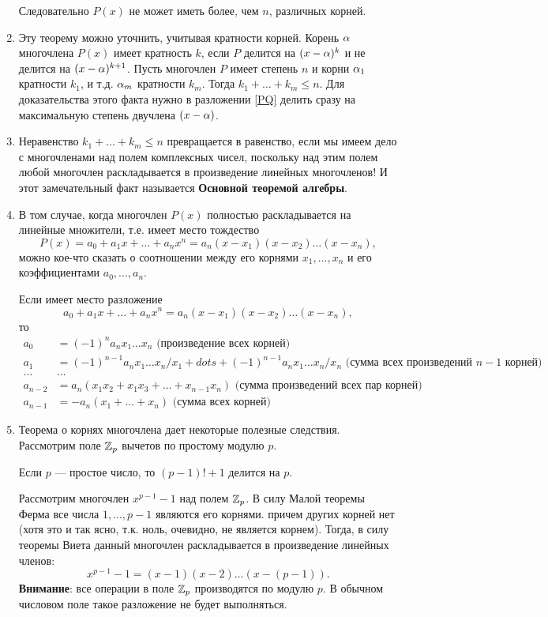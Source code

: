 \begin{enumerate}
Следовательно $P(x)$ не может иметь более, чем $n$, различных корней.
\epf

\item Эту теорему можно уточнить, учитывая кратности корней. Корень $\alpha$ многочлена $P(x)$ имеет кратность $k$, если $P$ делится на $(x-\alpha)^k$ и не делится на $(x-\alpha)^{k+1}$. Пусть многочлен $P$ имеет степень $n$ и корни $\alpha_1$ кратности $k_1$, и т.д. $\alpha_m$ кратности $k_m$. Тогда $k_1+\dots+k_m\le n$. Для доказательства этого факта нужно в разложении \eqref{PQ} делить сразу на максимальную степень двучлена $(x-\alpha)$.
\item Неравенство $k_1+\dots+k_m\le n$ превращается в равенство, если мы имеем дело с многочленами над полем комплексных чисел, поскольку над этим полем любой многочлен раскладывается в произведение линейных многочленов! И этот замечательный факт называется \textbf{Основной теоремой алгебры}.

\item В том случае, когда многочлен $P(x)$ полностью раскладывается на линейные множители, т.е. имеет место тождество
$$
P(x)=a_0+a_1x+\dots+a_nx^n = a_n(x-x_1)(x-x_2)\dots(x-x_n),
$$
можно кое-что сказать о соотношении между его корнями $x_1,\dots,x_n$ и его коэффициентами $a_0,\dots,a_n$.
\begin{thrm}[Виета]
Если имеет место разложение
$$
a_0+a_1x+\dots+a_nx^n = a_n(x-x_1)(x-x_2)\dots(x-x_n),
$$
то
\begin{align*}
a_0 & = (-1)^na_nx_1\dots x_n\mbox{  (произведение всех корней)} \\
a_1 & = (-1)^{n-1}a_nx_1\dots x_n/x_1+dots+(-1)^{n-1}a_nx_1\dots x_n/x_n \mbox{  (сумма всех произведений $n-1$ корней)} \\
\dots & \dots \\
a_{n-2} & = a_n(x_1x_2+x_1x_3+\dots + x_{n-1}x_n)\mbox{  (сумма произведений всех пар корней)} \\
a_{n-1} & = -a_n(x_1+\dots+x_n) \mbox{  (сумма всех корней)}
\end{align*}
\end{thrm}

\item Теорема о корнях многочлена дает некоторые полезные следствия. Рассмотрим поле $\mathbb Z_p$ вычетов по простому модулю $p$.
\begin{thrm}[Вильсона]\label{Wilson}
Если $p$ --- простое число, то $(p-1)!+1$ делится на $p$.
\end{thrm}
\pf
Рассмотрим многочлен $x^{p-1}-1$ над полем $\mathbb Z_p$. В силу Малой теоремы Ферма все числа $1,\dots,p-1$ являются его корнями. причем других корней нет (хотя это и так ясно, т.к. ноль, очевидно, не является корнем). Тогда, в силу теоремы Виета данный многочлен раскладывается в произведение линейных членов:
$$
x^{p-1}-1 = (x-1)(x-2)\dots (x-(p-1)).
$$
\textbf{Внимание}: все операции в поле $\mathbb Z_p$ производятся по модулю $p$. В обычном числовом поле такое разложение не будет выполняться.


\end{enumerate}
